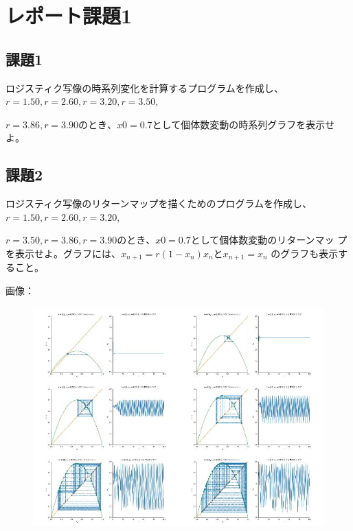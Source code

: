 \section{レポート課題1}
\subsection{課題1}
ロジスティク写像の時系列変化を計算するプログラムを作成し、$r = 1.50, r = 2.60,r = 3.20, r = 3.50,$ \par
$r = 3.86, r = 3.90 のとき、x0 = 0.7$として個体数変動の時系列グラフを表示せよ。\par

\subsection{課題2}
ロジスティク写像のリターンマップを描くためのプログラムを作成し、$r = 1.50, r = 2.60, r = 3.20,$ \par
$r = 3.50, r = 3.86, r = 3.90 のとき、x0 = 0.7$として個体数変動のリターンマッ
プを表示せよ。グラフには、$x_{n+1} = r(1 −x_n)x_n とx_{n+1} = x_n$ のグラフも表示すること。\par
画像：
\begin{figure}[h]
  \includegraphics[width=15cm]{images/ctest2.jpg}
\end{figure}

